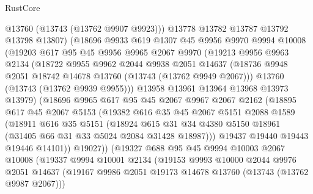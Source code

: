 \begin{lexlean}{RustCore}
\begin{coremodule}
              @13760
              (@13743 (@13762 @9907 @9923)))
            @13778
            @13782
            @13787
            @13792
            @13798
            @13807)
          (@18696
            @9933
            @619
            @1307
            @45
            @9956
            @9970
            @9994
            @10008
            (@19203
              @617
              @95
              @45
              @9956
              @9965
              @2067
              @9970
              (@19213
                @9956
                @9963
                @2134
                (@18722
                  @9955
                  @9962
                  @2044
                  @9938
                  @2051
                  @14637
                  (@18736 @9948 @2051 @18742 @14678 @13760 (@13743 (@13762 @9949 @2067)))
                  @13760
                  (@13743 (@13762 @9939 @9955)))
                @13958
                @13961
                @13964
                @13968
                @13973
                @13979)
              (@18696
                @9965
                @617
                @95
                @45
                @2067
                @9967
                @2067
                @2162
                (@18895
                  @617
                  @45
                  @2067
                  @5153
                  (@19382
                    @616
                    @35
                    @45
                    @2067
                    @5151
                    @2088
                    @1589
                    (@18911
                      @616
                      @35
                      @5151
                      (@18924
                        @615
                        @31
                        @34
                        @4380
                        @5150
                        @18961
                        (@31405 @66 @31 @33 @5024 @2084 @31428 @18987)))
                    @19437
                    @19440
                    @19443
                    @19446
                    @14101))
                @19027))
            (@19327
              @688
              @95
              @45
              @9994
              @10003
              @2067
              @10008
              (@19337
                @9994
                @10001
                @2134
                (@19153
                  @9993
                  @10000
                  @2044
                  @9976
                  @2051
                  @14637
                  (@19167 @9986 @2051 @19173 @14678 @13760 (@13743 (@13762 @9987 @2067)))

\end{coremodule}
\end{lexlean}
